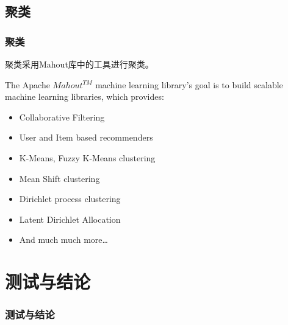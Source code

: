 \documentclass[CJKutf8, table]{beamer}
\begin{document}
\begin{CJK}{UTF8}{gbsn}
\subsection{聚类}
\begin{frame}
  \frametitle{聚类}
  \begin{block}{}
    聚类采用Mahout库中的工具进行聚类。
  \end{block}
  \pause
  \begin{block}{}
    The Apache \href{http://mahout.apache.org/}{$Mahout^{TM}$} machine learning library's goal is to build scalable
    machine learning libraries\cite{Mahout}, which provides:
    \begin{center}
    \begin{itemize}
        \item Collaborative Filtering
        \item User and Item based recommenders
        \item K-Means, Fuzzy K-Means clustering
        \item Mean Shift clustering
        \item Dirichlet process clustering
        \item Latent Dirichlet Allocation
        \item And much much more\ldots
      \end{itemize}
    \end{center}
  \end{block}
  
\end{frame}

\section{测试与结论}
\begin{frame}
  \frametitle{测试与结论}
\end{frame}


\end{CJK}
\end{document}
